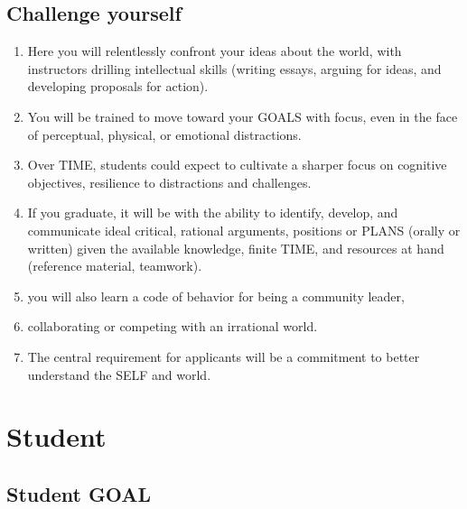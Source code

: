 \documentclass[
]{book}
\providecommand{\tightlist}{%
  \setlength{\itemsep}{0pt}\setlength{\parskip}{0pt}}
\begin{document}
\hypertarget{challenge-yourself}{%
\subsection{Challenge yourself}\label{challenge-yourself}}

\begin{enumerate}
\def\labelenumi{\arabic{enumi}.}
\setcounter{enumi}{7}
\tightlist
\item
  Here you will relentlessly confront your ideas about the world, with instructors
  drilling intellectual skills (writing essays, arguing for ideas, and developing
  proposals for action).
\item
  You will be trained to move toward your GOALS with focus, even in the face of
  perceptual, physical, or emotional distractions.
\item
  Over TIME, students could expect to cultivate a sharper focus on cognitive
  objectives, resilience to distractions and challenges.
\item
  If you graduate, it will be with the ability to identify, develop, and communicate
  ideal critical, rational arguments, positions or PLANS (orally or written) given the
  available knowledge, finite TIME, and resources at hand (reference material,
  teamwork).
\item
  you will also learn a code of behavior for being a community leader,
\item
  collaborating or competing with an irrational world.
\item
  The central requirement for applicants will be a commitment to better
  understand the SELF and world.
\end{enumerate}

\hypertarget{student}{%
\section{Student}\label{student}}

\hypertarget{student-goal}{%
\subsection{Student GOAL}\label{student-goal}}
\end{document}

